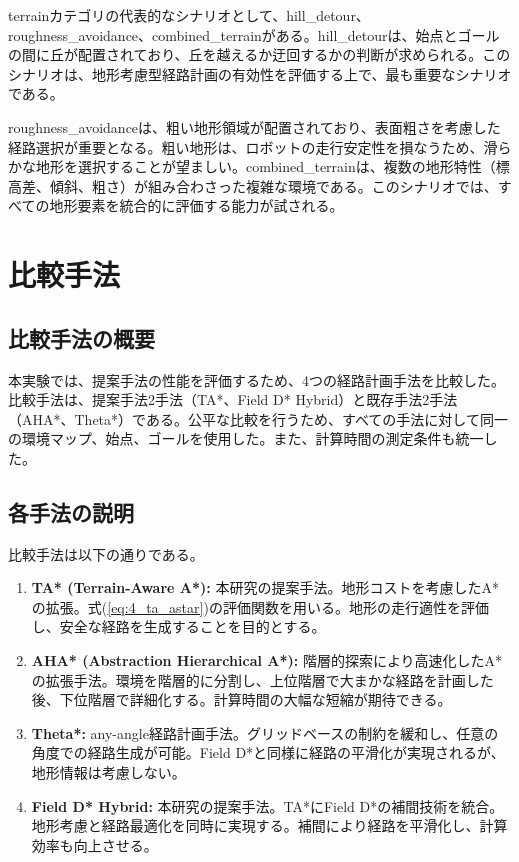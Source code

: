 terrainカテゴリの代表的なシナリオとして、hill\_detour、roughness\_avoidance、combined\_terrainがある。hill\_detourは、始点とゴールの間に丘が配置されており、丘を越えるか迂回するかの判断が求められる。このシナリオは、地形考慮型経路計画の有効性を評価する上で、最も重要なシナリオである。

roughness\_avoidanceは、粗い地形領域が配置されており、表面粗さを考慮した経路選択が重要となる。粗い地形は、ロボットの走行安定性を損なうため、滑らかな地形を選択することが望ましい。combined\_terrainは、複数の地形特性（標高差、傾斜、粗さ）が組み合わさった複雑な環境である。このシナリオでは、すべての地形要素を統合的に評価する能力が試される。

\section{比較手法}

\subsection{比較手法の概要}

本実験では、提案手法の性能を評価するため、4つの経路計画手法を比較した。比較手法は、提案手法2手法（TA*、Field D* Hybrid）と既存手法2手法（AHA*、Theta*）である。公平な比較を行うため、すべての手法に対して同一の環境マップ、始点、ゴールを使用した。また、計算時間の測定条件も統一した。

\subsection{各手法の説明}

比較手法は以下の通りである。

\begin{enumerate}
\item \textbf{TA* (Terrain-Aware A*):} 本研究の提案手法。地形コストを考慮したA*の拡張。式(\ref{eq:4_ta_astar})の評価関数を用いる。地形の走行適性を評価し、安全な経路を生成することを目的とする。

\item \textbf{AHA* (Abstraction Hierarchical A*):} 階層的探索により高速化したA*の拡張手法。環境を階層的に分割し、上位階層で大まかな経路を計画した後、下位階層で詳細化する。計算時間の大幅な短縮が期待できる。

\item \textbf{Theta*:} any-angle経路計画手法。グリッドベースの制約を緩和し、任意の角度での経路生成が可能。Field D*と同様に経路の平滑化が実現されるが、地形情報は考慮しない。

\item \textbf{Field D* Hybrid:} 本研究の提案手法。TA*にField D*の補間技術を統合。地形考慮と経路最適化を同時に実現する。補間により経路を平滑化し、計算効率も向上させる。
\end{enumerate}

